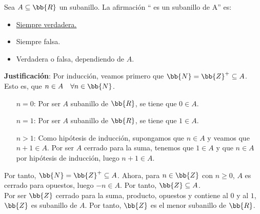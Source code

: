 \begin{ejercicio}
    Sea $A \subseteq \bb{R}$ un subanillo. La afirmación `` es un subanillo de A'' es:
    \begin{itemize}
        \item \underline{Siempre verdadera.}
        \item Siempre falsa.
        \item Verdadera o falsa, dependiendo de $A$.
    \end{itemize}

    \noindent
    \textbf{Justificación}:
    Por inducción, veamos primero que $\bb{N} = \bb{Z}^{+} \subseteq A$.\newline
    Esto es, que $n \in A\quad\forall n \in \bb{N}$.
    \begin{enumerate}
        \item [$n=0$:]
            Por ser $A$ subanillo de $\bb{R}$, se tiene que $0 \in A$.
        \item [$n=1$:]
            Por ser $A$ subanillo de $\bb{R}$, se tiene que $1 \in A$.
        \item [$n>1$:]
            Como hipótesis de inducción, supongamos que $n \in A$ y veamos que $n+1 \in A$.\newline
            Por ser $A$ cerrado para la suma, tenemos que $1 \in A$ y que $n \in A$ por hipótesis de inducción, luego $n+1 \in A$.
    \end{enumerate}
    Por tanto, $\bb{N} = \bb{Z}^{+} \subseteq A$.\newline
    Ahora, para $n \in \bb{Z}$ con $n \geq 0$, $A$ es cerrado para opuestos, luego $-n \in A$.\newline
    Por tanto, $\bb{Z} \subseteq A$.\\

    \noindent
    Por ser $\bb{Z}$ cerrado para la suma, producto, opuestos y contiene al $0$ y al $1$, $\bb{Z}$ es subanillo de $A$. Por tanto, $\bb{Z}$ es el menor subanillo de $\bb{R}$.
\end{ejercicio}

\newpage
\resetearcontador

